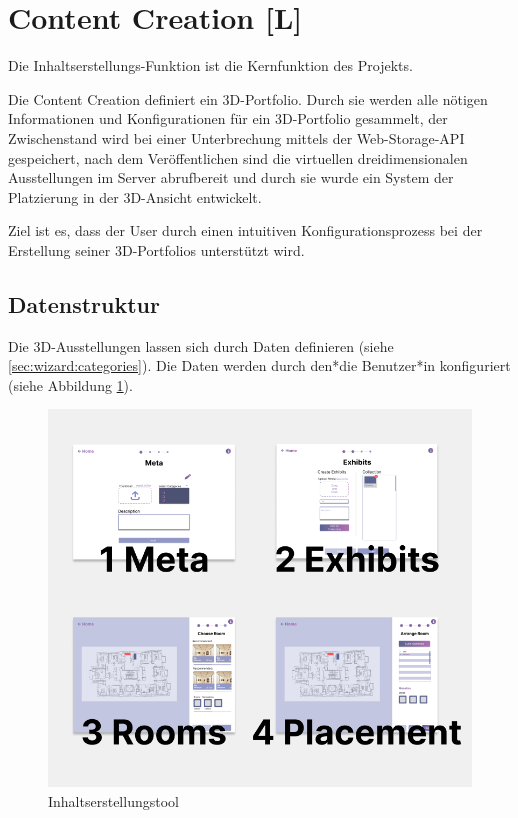 \section{Content Creation [L]}
\label{content-creation}
Die Inhaltserstellungs-Funktion ist die Kernfunktion des Projekts.

Die Content Creation definiert ein 3D-Portfolio. Durch sie werden alle nötigen Informationen und Konfigurationen für ein 3D-Portfolio gesammelt, der Zwischenstand wird bei einer Unterbrechung mittels der Web-Storage-API gespeichert, nach dem Veröffentlichen sind die virtuellen dreidimensionalen Ausstellungen im Server abrufbereit und durch sie wurde ein System der Platzierung in der 3D-Ansicht entwickelt.

Ziel ist es, dass der User durch einen intuitiven Konfigurationsprozess bei der Erstellung seiner 3D-Portfolios unterstützt wird.

\subsection{Datenstruktur}
Die 3D-Ausstellungen lassen sich durch Daten definieren (siehe \ref{sec:wizard:categories}). Die Daten werden durch den*die Benutzer*in konfiguriert (siehe Abbildung \ref{fig:impl:creation:fourCategoires}).

\begin{figure}[ht]
    \centering
    \includegraphics[scale=0.4]{pics/CreateCreation4Categories.png}
    \caption{Inhaltserstellungstool}
    \label{fig:impl:creation:fourCategoires}
\end{figure}

